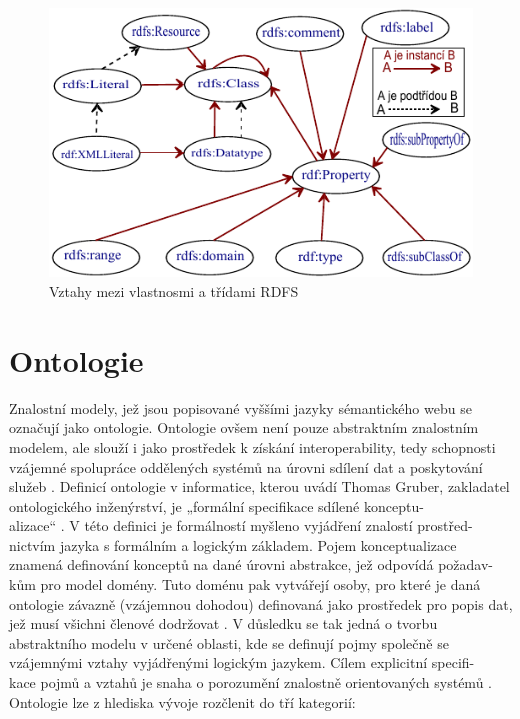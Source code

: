 \documentclass{projekt}
\begin{document}
\begin{figure}[htb]
\begin{center}
\includegraphics[scale=1.4]{rdfs.pdf}
\caption{Vztahy mezi vlastnosmi a třídami RDFS}
\end{center}
\end{figure}

\section{Ontologie}
\hspace{0.65cm}Znalostní modely, jež jsou popisované vyššími jazyky sémantického webu se označují jako ontologie. Ontologie ovšem není pouze abstraktním znalostním modelem, ale slouží i jako prostředek k získání interoperability, tedy schopnosti vzájemné spolupráce oddělených systémů na úrovni sdílení dat a poskytování služeb \cite{_2}. Definicí ontologie v informatice, kterou uvádí Thomas Gruber, zakladatel ontologického inženýrství, je „formální specifikace sdílené konceptu-\\alizace“ \cite{_8}. V této definici je formálností myšleno vyjádření znalostí prostřed-\\nictvím jazyka s formálním a logickým základem. Pojem konceptualizace znamená definování konceptů na dané úrovni abstrakce, jež odpovídá požadav-\\kům pro model domény. Tuto doménu pak vytvářejí osoby, pro které je daná ontologie závazně (vzájemnou dohodou) definovaná jako prostředek pro popis dat, jež musí všichni členové dodržovat \cite{_2}. V důsledku se tak jedná o tvorbu abstraktního modelu v určené oblasti, kde se definují pojmy společně se vzájemnými vztahy vyjádřenými logickým jazykem. Cílem explicitní specifi-\\kace pojmů a vztahů je snaha o porozumění znalostně orientovaných systémů \cite{_9}.
Ontologie lze z hlediska vývoje rozčlenit do tří kategorií:
\end{document}

